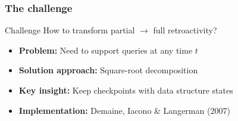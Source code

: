 \documentclass[fleqn]{beamer}
\begin{document}
\begin{frame}
    \frametitle{The challenge}
    
    \begin{alertblock}{Challenge}
        How to transform partial $\rightarrow$ full retroactivity?
    \end{alertblock} \pause
    
    \begin{itemize}
    \item \textbf{Problem:} Need to support queries at any time $t$ \vfill
    \item \textbf{Solution approach:} Square-root decomposition \vfill\pause
    \item \textbf{Key insight:} Keep checkpoints with data structure states \vfill
    \item \textbf{Implementation:} Demaine, Iacono \& Langerman (2007) \vfill
    \end{itemize}
\end{frame}
\end{document}
